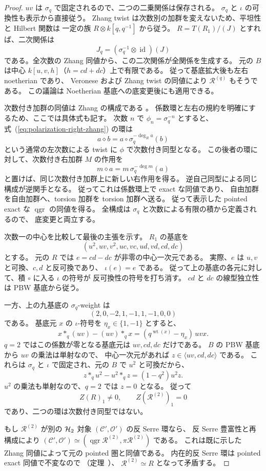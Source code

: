 \begin{proof}
$uv$ は $\sigma_q$ で固定されるので、二つの二乗関係は保存される。
$\sigma_q$ と $\iota$ の可換性も表示から直接従う。
Zhang twist は次数別の加群を変えないため、平坦性と Hilbert 関数は
一定の族 $R\otimes k[q,q^{-1}]$ から従う。
$R=T(R_1)/(J)$ とすれば、二次関係は
\[
 J_q=(\sigma_q^{-1}\otimes\operatorname{id})(J)
\]
である。全次数の Zhang 同値から、この二次関係が全関係を生成する。
元の $B$ は中心 $k[u,v,h]$（$h=cd+dc$）上で有限である。
従って基底拡大後も左右 noetherian であり、
Veronese および Zhang twist の同値により $\mathcal R^{(q)}$ もそうである。
この議論は Noetherian 基底への底変更後にも適用できる。

次数付き加群の同値は Zhang の構成である
\cite[Theorem 3.1]{Zhang1996}。
係数環と左右の規約を明確にするため、ここでは具体式も記す。
次数 $n$ で $\phi_n=\sigma_q^{-n}$ とすると、
式~(\ref{eq:polarization-right-zhang}) の環は
\[
 a\diamond b=a\mathbin{\circ}\sigma_q^{-\deg_R a}(b)
\]
という通常の左次数による twist に $\phi$ で次数付き同型となる。
この後者の環に対して、次数付き右加群 $M$ の作用を
\[
 m\diamond a=m\,\sigma_q^{-\deg m}(a)
\]
と置けば、同じ次数付き加群上に新しい右作用を得る。
逆自己同型による同じ構成が逆関手となる。
従ってこれは係数環上で exact な同値であり、
自由加群を自由加群へ、torsion 加群を torsion 加群へ送る。
従って表示した pointed exact な $\operatorname{qgr}$ の同値を得る。
全構成は $\sigma_q$ と次数による有限の積から定義されるので、
底変更と両立する。

次数一の中心を比較して最後の主張を示す。
$R_1$ の基底を
\[
 (u^2,uv,v^2,uc,vc,ud,vd,cd,dc)
 \tag{P-basis}\label{eq:polarization-generator-basis}
\]
とする。
元の $R$ では $e=cd-dc$ が非零の中心一次元である。
実際、$e$ は $u,v$ と可換、$c,d$ と反可換であり、
$\iota(e)=e$ である。
従って上の基底の各元に対して、積 $\circ$ に入る $\iota$ の符号が
反可換性の符号を打ち消す。
$cd$ と $dc$ の線型独立性は PBW 基底から従う。

一方、上の九基底の $\sigma_q$-weight は
\[
 (2,0,-2,1,-1,1,-1,0,0)
\]
である。
基底元 $x$ の $\iota$-符号を $\eta_x\in\{1,-1\}$ とすると、
\[
 x*_q(uv)-(uv)*_q x
 =(q^{\operatorname{wt}(x)}-\eta_x)\,uvx.
\]
$q=2$ ではこの係数が零となる基底元は $uv,cd,dc$ だけである。
$B$ の PBW 基底から $uv$ の乗法は単射なので、
中心一次元があれば $z\in\langle uv,cd,dc\rangle$ である。
これらは $\sigma_q$ と $\iota$ で固定され、元の $B$ で $u^2$ と可換だから、
\[
 z*_q u^2-u^2*_q z=(1-q^2)u^2z.
\]
$u^2$ の乗法も単射なので、$q=2$ では $z=0$ となる。
従って
\[
 Z(R)_1\ne0,\qquad Z(\mathcal R^{(2)})_1=0
\]
であり、二つの環は次数付き同型ではない。

もし $\mathcal R^{(2)}$ が別の $\mathcal H_2$ 対象
$(\mathcal C',\mathcal O')$ の反 Serre 環なら、
反 Serre 豊富性と再構成により
$(\mathcal C',\mathcal O')\simeq
(\operatorname{qgr}\mathcal R^{(2)},\pi\mathcal R^{(2)})$ である。
これは既に示した Zhang 同値によって元の pointed 圏と同値である。
内在的反 Serre 環は pointed exact 同値で不変なので
（定理~\cite[\texttt{thm:antiserre-invariant}]{QuadricIntrinsic2026}）、
$\mathcal R^{(2)}\simeq R$ となって矛盾する。
\end{proof}

